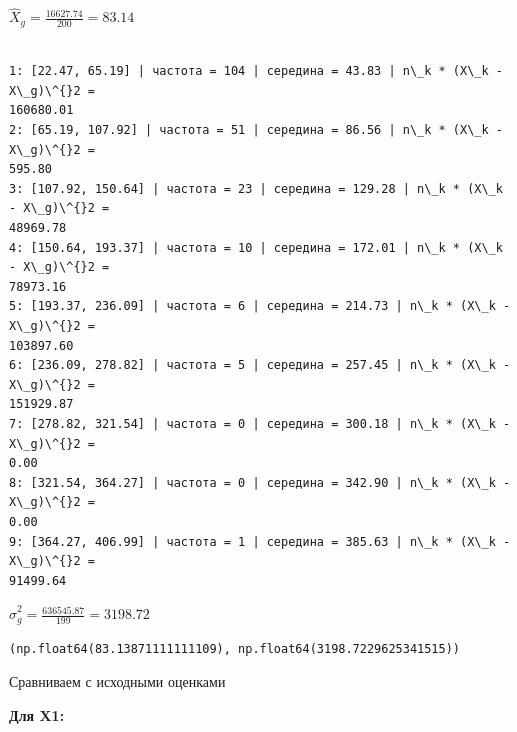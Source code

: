 \documentclass[11pt]{article}
\makeatletter
\newcommand{\boxspacing}{\kern\kvtcb@left@rule\kern\kvtcb@boxsep}
\newcommand{\prompt}[4]{
        {\ttfamily\llap{{\color{#2}[#3]:\hspace{3pt}#4}}\vspace{-\baselineskip}}
    }
\makeatother
\begin{document}
    $\displaystyle \hat{X}_g = \frac{16627.74}{200} = 83.14$

    
    \begin{Verbatim}[commandchars=\\\{\}]

1: [22.47, 65.19] | частота = 104 | середина = 43.83 | n\_k * (X\_k - X\_g)\^{}2 =
160680.01
2: [65.19, 107.92] | частота = 51 | середина = 86.56 | n\_k * (X\_k - X\_g)\^{}2 =
595.80
3: [107.92, 150.64] | частота = 23 | середина = 129.28 | n\_k * (X\_k - X\_g)\^{}2 =
48969.78
4: [150.64, 193.37] | частота = 10 | середина = 172.01 | n\_k * (X\_k - X\_g)\^{}2 =
78973.16
5: [193.37, 236.09] | частота = 6 | середина = 214.73 | n\_k * (X\_k - X\_g)\^{}2 =
103897.60
6: [236.09, 278.82] | частота = 5 | середина = 257.45 | n\_k * (X\_k - X\_g)\^{}2 =
151929.87
7: [278.82, 321.54] | частота = 0 | середина = 300.18 | n\_k * (X\_k - X\_g)\^{}2 =
0.00
8: [321.54, 364.27] | частота = 0 | середина = 342.90 | n\_k * (X\_k - X\_g)\^{}2 =
0.00
9: [364.27, 406.99] | частота = 1 | середина = 385.63 | n\_k * (X\_k - X\_g)\^{}2 =
91499.64
    \end{Verbatim}

    $\displaystyle \hat{\sigma}_g^2 = \frac{636545.87}{199} = 3198.72$

    
            \begin{tcolorbox}[breakable, size=fbox, boxrule=.5pt, pad at break*=1mm, opacityfill=0]
\prompt{Out}{outcolor}{18}{\boxspacing}
\begin{Verbatim}[commandchars=\\\{\}]
(np.float64(83.13871111111109), np.float64(3198.7229625341515))
\end{Verbatim}
\end{tcolorbox}
        
    Сравниваем с исходными оценками

\textbf{Для X1:}
\end{document}

